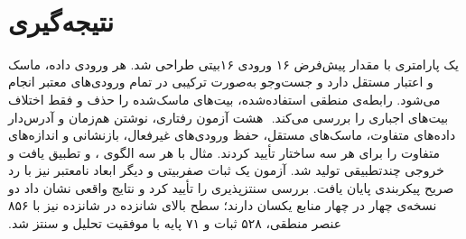 ‫
‫\section{نتیجه‌گیری}
‫
‫یک  پارامتری با مقدار پیش‌فرض ۱۶ ورودی ۱۶‌بیتی طراحی شد. هر ورودی داده، ماسک
‫و اعتبار مستقل دارد و جست‌وجو به‌صورت ترکیبی در تمام ورودی‌های معتبر انجام می‌شود. رابطه‌ی
‫منطقی استفاده‌شده، بیت‌های ماسک‌شده را حذف و فقط اختلاف بیت‌های اجباری را بررسی می‌کند.
‫
‫هشت آزمون رفتاری، نوشتن هم‌زمان و آدرس‌دار داده‌های متفاوت، ماسک‌های مستقل، حفظ ورودی‌های غیرفعال،
‫بازنشانی و اندازه‌های متفاوت را برای هر سه ساختار تأیید کردند. مثال 
‫با هر سه الگوی ،  و  تطبیق یافت
‫و خروجی چندتطبیقی  تولید شد. آزمون یک ثبات صفر‌بیتی و دیگر ابعاد نامعتبر
‫نیز با رد صریح پیکربندی پایان یافت. بررسی  سنتزپذیری را تأیید کرد و نتایج واقعی  نشان داد دو نسخه‌ی چهار در چهار منابع یکسان دارند؛ سطح بالای شانزده در شانزده نیز با ۸۵۶ عنصر منطقی، ۵۲۸ ثبات و ۷۱ پایه با موفقیت تحلیل و سنتز شد.
‫